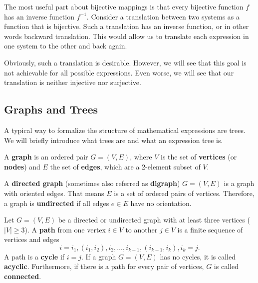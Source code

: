 The most useful part about bijective mappings is that every bijective function $f$ has an inverse function $f^{-1}$. Consider a translation between two systems as a function that is bijective. Such a translation has an inverse function, or in other words backward translation. This would allow us to translate each expression in one system to the other and back again.

Obviously, such a translation is desirable. However, we will see that this goal is not achievable for all possible expressions. Even worse, we will see that our translation is neither injective nor surjective.

\subsection{Graphs and Trees}
A typical way to formalize the structure of mathematical expressions are trees. We will briefly introduce what trees are and what an expression tree is.

\begin{definition}[Graph]
A \textbf{graph} is an ordered pair $G=(V,E)$, where $V$ is the set of \textbf{vertices} (or \textbf{nodes}) and $E$ the set of \textbf{edges}, which are a 2-element subset of $V$.
\end{definition}

\begin{definition}
A \textbf{directed graph} (sometimes also referred as \textbf{digraph}) $G = (V,E)$ is a graph with oriented edges. That means $E$ is a set of ordered pairs of vertices. Therefore, a graph is \textbf{undirected} if all edges $e \in E$ have no orientation.
\end{definition}

\begin{definition}
Let $G = (V,E)$ be a directed or undirected graph with at least three vertices ($|V| \geq 3$). A \textbf{path} from one vertex $i\in V$ to another $j\in V$ is a finite sequence of vertices and edges
\begin{equation}
i = i_1, (i_1, i_2), i_2, \ldots , i_{k-1}, (i_{k-1}, i_k), i_k = j.
\end{equation}
A path is a \textbf{cycle} if $i = j$. If a graph $G = (V,E)$ has no cycles, it is called \textbf{acyclic}. Furthermore, if there is a path for every pair of vertices, $G$ is called \textbf{connected}.
\end{definition}

